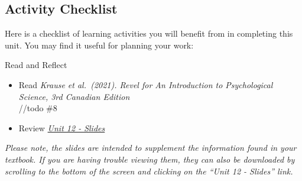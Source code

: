 \documentclass[
]{book}
\providecommand{\tightlist}{%
  \setlength{\itemsep}{0pt}\setlength{\parskip}{0pt}}
\begin{document}
\hypertarget{activity-checklist-10}{%
\subsection*{Activity Checklist}\label{activity-checklist-10}}

Here is a checklist of learning activities you will benefit from in completing this unit. You may find it useful for planning your work:

\begin{reflect}
{Read and Reflect}

\begin{itemize}
\tightlist
\item
  Read \emph{Krause et al.~(2021). Revel for An Introduction to Psychological Science, 3rd Canadian Edition}\\
  //todo \#8
\item
  Review \href{PSYC106-CH16Therapies3rdEd.pptx}{\emph{Unit 12 - Slides}}
\end{itemize}

\emph{Please note, the slides are intended to supplement the information found in your textbook. If you are having trouble viewing them, they can also be downloaded by scrolling to the bottom of the screen and clicking on the ``Unit 12 - Slides'' link.}


\end{reflect}
\end{document}
